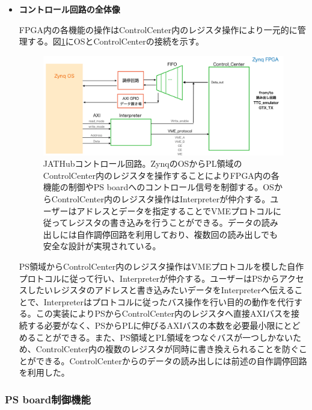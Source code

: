 \begin{itemize}
\item{\textbf{コントロール回路の全体像}}

FPGA内の各機能の操作はControlCenter内のレジスタ操作により一元的に管理する。図\ref{JATHubccenter}にOSとControlCenterの接続を示す。

\begin{figure} 
\centering
\includegraphics[width=16cm]{fig/QAQC/JATHubccenter.png}
\caption[JATHubコントロール回路]{JATHubコントロール回路。ZynqのOSからPL領域のControlCenter内のレジスタを操作することによりFPGA内の各機能の制御やPS boardへのコントロール信号を制御する。OSからControlCenter内のレジスタ操作はInterpreterが仲介する。ユーザーはアドレスとデータを指定することでVMEプロトコルに従ってレジスタの書き込みを行うことができる。データの読み出しには自作調停回路を利用しており、複数回の読み出しでも安全な設計が実現されている。}
\label{JATHubccenter}
\end{figure}

PS領域からControlCenter内のレジスタ操作はVMEプロトコルを模した自作プロトコルに従って行い、Interpreterが仲介する。ユーザーはPSからアクセスしたいレジスタのアドレスと書き込みたいデータをInterpreterへ伝えることで、Interpreterはプロトコルに従ったバス操作を行い目的の動作を代行する。この実装によりPSからControlCenter内のレジスタへ直接AXIバスを接続する必要がなく、PSからPLに伸びるAXIバスの本数を必要最小限にとどめることができる。また、PS領域とPL領域をつなぐバスが一つしかないため、ControlCenter内の複数のレジスタが同時に書き換えられることを防ぐことができる。ControlCenterからのデータの読み出しには前述の自作調停回路を利用した。
\baselineskip
\end{itemize}

\subsubsection{\textbf{PS board制御機能}}

